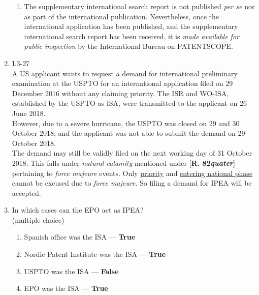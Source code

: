 \documentclass{report}
\begin{document}
\begin{enumerate}[label=\textbf{Answer \arabic*}]
\begin{enumerate}[label=(\alph*)]
        \item The supplementary international search report is not published \textit{per se} nor as part of the international publication. Nevertheless, once the international application has been published, and the supplementary international search report has been received, it is \textit{made available for public inspection} by the International Bureau on \textsc{PATENTSCOPE}. 
    \end{enumerate}

    \item %
    L3-27 \\
    A US applicant wants to request a demand for international preliminary examination at the USPTO for an international application filed on 29 December 2016 without any claiming priority. The ISR and WO-ISA, established by the USPTO as ISA, were transmitted to the applicant on 26 June 2018. \\
    However, due to a severe hurricane, the USPTO was closed on 29 and 30 October 2018, and the applicant was not able to submit the demand on 29 October 2018. \\
The demand may still be validly filed on the next working day of 31 October 2018. This falls under \textit{natural calamity} mentioned under [\textbf{R. 82\textit{quater}}] pertaining to \textit{force majeure} events. \newline Only \underline{priority} and \underline{entering national phase} cannot be excused due to \textit{force majeure}. So filing a demand for IPEA will be accepted. 

    \item %
    In which cases can the EPO act as IPEA? \\
    (multiple choice)
    
    \begin{enumerate}[label=(\alph*)]
        \item Spanish office was the ISA --- \textbf{True}
        \item Nordic Patent Institute was the ISA --- \textbf{True}
        \item USPTO was the ISA --- \textbf{False}
        \item EPO was the ISA --- \textbf{True}
        

\end{enumerate}
\end{enumerate}
\end{document}
